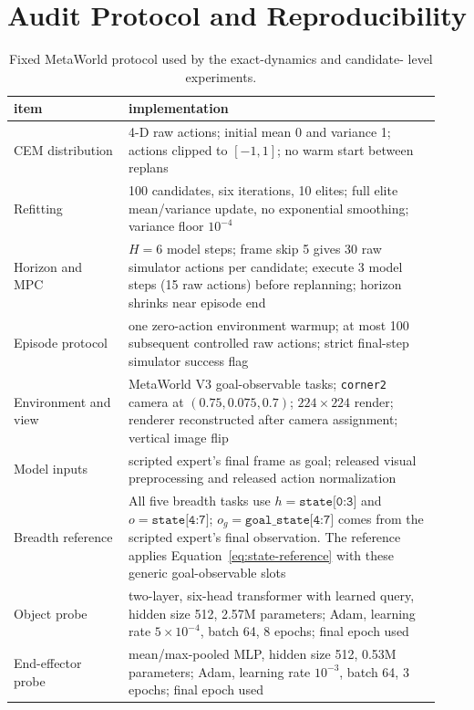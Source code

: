 \documentclass[10pt]{article}
\begin{document}



\appendix

\section{Audit Protocol and Reproducibility}\label{app:audit}

\begin{table}[ht]
\centering
\footnotesize
\caption{Fixed MetaWorld protocol used by the exact-dynamics and candidate-
level experiments.}
\label{tab:protocol}
\begin{tabular}{p{0.25\linewidth}p{0.68\linewidth}}
\toprule
item & implementation \\
\midrule
CEM distribution & 4-D raw actions; initial mean 0 and variance 1; actions
clipped to $[-1,1]$; no warm start between replans \\
Refitting & 100 candidates, six iterations, 10 elites; full elite
mean/variance update, no exponential smoothing; variance floor $10^{-4}$ \\
Horizon and MPC & $H=6$ model steps; frame skip 5 gives 30 raw simulator
actions per candidate; execute 3 model steps (15 raw actions) before replanning;
horizon shrinks near episode end \\
Episode protocol & one zero-action environment warmup; at most 100 subsequent
controlled raw actions; strict final-step simulator success flag \\
Environment and view & MetaWorld V3 goal-observable tasks; \texttt{corner2}
camera at $(0.75,0.075,0.7)$; $224{\times}224$ render; renderer reconstructed
after camera assignment; vertical image flip \\
Model inputs & scripted expert's final frame as goal; released visual
preprocessing and released action normalization \\
Breadth reference & \raggedright All five breadth tasks use
$h=\texttt{state[0:3]}$ and $o=\texttt{state[4:7]}$;
$o_g=\texttt{goal\_state[4:7]}$ comes from the scripted expert's final
observation. The reference applies Equation~\eqref{eq:state-reference} with
these generic goal-observable slots \tabularnewline
Object probe & two-layer, six-head transformer with learned query, hidden size
512, 2.57M parameters; Adam, learning rate $5{\times}10^{-4}$, batch 64,
8 epochs; final epoch used \\
End-effector probe & mean/max-pooled MLP, hidden size 512, 0.53M parameters;
Adam, learning rate $10^{-3}$, batch 64, 3 epochs; final epoch used \\

\end{tabular}
\end{table}
\end{document}
